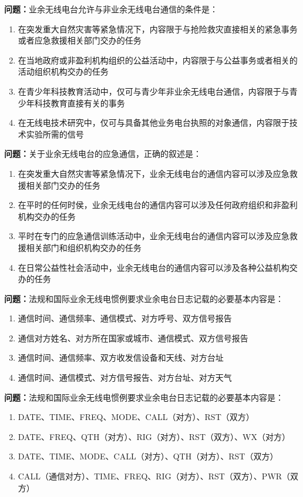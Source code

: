 \textbf{问题：}业余无线电台允许与非业余无线电台通信的条件是：
\begin{enumerate}[label=\Alph*), leftmargin=1cm]
	\item 在突发重大自然灾害等紧急情况下，内容限于与抢险救灾直接相关的紧急事务或者应急救援相关部门交办的任务
	\item 在当地政府或非盈利机构组织的公益活动中，内容限于与公益事务或者相关的活动组织机构交办的任务
	\item 在青少年科技教育活动中，仅可与青少年非业余无线电台通信，内容限于与青少年科技教育直接有关的事务
	\item 在无线电技术研究中，仅可与具备其他业务电台执照的对象通信，内容限于技术实验所需的信号
\end{enumerate}

\textbf{问题：}关于业余无线电台的应急通信，正确的叙述是：
\begin{enumerate}[label=\Alph*), leftmargin=1cm]
	\item 在突发重大自然灾害等紧急情况下，业余无线电台的通信内容可以涉及应急救援相关部门交办的任务
	\item 在平时的任何时侯，业余无线电台的通信内容可以涉及任何政府组织和非盈利机构交办的任务
	\item 平时在专门的应急通信训练活动中，业余无线电台的通信内容可以涉及应急救援相关部门和组织机构交办的任务
	\item 在日常公益性社会活动中，业余无线电台的通信内容可以涉及各种公益机构交办的任务
\end{enumerate}

\textbf{问题：}法规和国际业余无线电惯例要求业余电台日志记载的必要基本内容是：
\begin{enumerate}[label=\Alph*), leftmargin=1cm]
	\item 通信时间、通信频率、通信模式、对方呼号、双方信号报告
	\item 通信对方姓名、对方所在国家或城市、通信模式、双方信号报告
	\item 通信时间、通信频率、双方收发信设备和天线、对方台址
	\item 通信时间、通信模式、对方信号报告、对方台址、对方天气
\end{enumerate}

\textbf{问题：}法规和国际业余无线电惯例要求业余电台日志记载的必要基本内容是：
\begin{enumerate}[label=\Alph*), leftmargin=1cm]
	\item DATE、TIME、FREQ、MODE、CALL（对方）、RST（双方）
	\item DATE、FREQ、QTH（对方）、RIG（对方）、RST（双方）、WX（对方）
	\item DATE、TIME、MODE、CALL（对方）、QTH（对方）、RST（双方）
	\item CALL（通信对方）、TIME、FREQ、RIG（对方）、RST（双方）、PWR（双方）
\end{enumerate}

